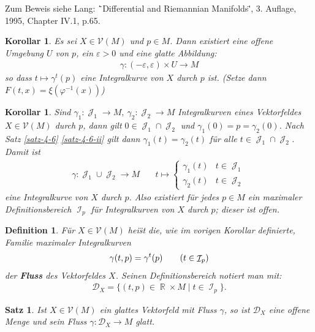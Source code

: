 \documentclass[paper=A4, twoside, chapterprefix=true, bibliography=totoc, headsepline]{scrbook}
\let\temp\phi{}
\let\phi\varphi{}
\let\varphi\temp{}
\let\temp\theta{}
\let\theta\vartheta{}
\let\vartheta\temp{}
\let\temp\epsilon{}
\let\epsilon\varepsilon{}
\let\varepsilon\temp{}
\let\temp\rho{}
\let\rho\varrho{}
\let\varrho\temp{}
\DeclareMathOperator{\R}{\mathbb{R}}
\DeclareMathOperator{\calI}{\mathcal{I}}
\DeclareMathOperator{\calJ}{\mathcal{J}}
\theoremstyle{plain}
\newtheorem{Satz}[Dfn]{Satz}
\newtheorem{Kor}[Dfn]{Korollar}
\theoremstyle{nonumberplain}
\newtheorem{dfn}{Definition}
\theoremstyle{empty}
\theoremstyle{break}
\newcommand{\CmIndex}[2][]{\ifthenelse{\isempty{#1}}{\index{#2}}{\index{#1}}#2}
\newcommand{\CmMark}[2][]{\textbf{\CmIndex[#1]{#2}}}
\begin{document}
Zum Beweis siehe Lang: \"`Differential and Riemannian Manifolds\"', 3. Auflage, 1995, Chapter IV.1, p.65\cite{lang1995differential}.

\begin{Kor}\label{korollar-4-7}\label{kor-4-7}
  Es sei $X \in \mathcal V(M)$ und $p \in M$. Dann existiert eine offene Umgebung $U$ von $p$, ein $\epsilon > 0$ und eine glatte Abbildung:
  \begin{align*}
    \gamma\colon(-\epsilon,\epsilon) \times U \to M
  \end{align*}
  so dass $t \mapsto \gamma^t(p)$ eine Integralkurve von $X$ durch $p$ ist. (Setze dann $F(t,x) = \xi(\phi^{-1}(x))$)
\end{Kor}

\begin{Kor}\label{korollar-4-8}
  Sind $\gamma_1 \colon \calJ_1 \to M, \ \gamma_2 \colon \calJ_2 \to M$ Integralkurven eines Vektorfeldes $X \in \mathcal V(M)$ durch $p$, dann gilt $0 \in \calJ_1 \cap \calJ_2$ und $\gamma_1(0)= p = \gamma_2(0)$.
  Nach Satz \ref{satz-4-6} \ref{satz-4-6-ii} gilt dann $\gamma_1(t) = \gamma_2(t)$ f\"ur alle $t \in \calJ_1 \cap \calJ_2$. Damit ist
  \begin{align*}
    \gamma \colon \calJ_1 \cup \calJ_2 \to M && \ t \mapsto 
    \begin{cases}
      \gamma_1(t) & t \in \calJ_1\\
      \gamma_2(t) & t \in \calJ_2
    \end{cases}
  \end{align*}
  eine Integralkurve von $X$ durch $p$.
  Also existiert f\"ur jedes $p \in M$ ein maximaler Definitionsbereich $\calI_p$ f\"ur Integralkurven von $X$ durch $p$; dieser ist offen.
\end{Kor}

\begin{dfn}
  F\"ur $X \in \mathcal V(M)$ hei\"st die, wie im vorigen Korollar definierte, Familie maximaler Integralkurven
  \begin{align*}
    \gamma(t,p) = \gamma^t(p) \tag{$t \in \calI_p$}
  \end{align*}
  der \CmMark{Fluss} des Vektorfeldes $X$.
  Seinen Definitionsbereich notiert man mit:
  \begin{align*}
    \mathcal D_X = \{(t,p) \in \R \times M \mid t \in \calI_p\}.
  \end{align*}
\end{dfn}

\begin{Satz}\label{satz-4-9}
  Ist $X \in \mathcal V(M)$ ein glattes Vektorfeld mit Fluss $\gamma$, so ist $\mathcal D_X$ eine offene Menge und sein Fluss $\gamma \colon \mathcal D_X \to M$ glatt.
\end{Satz}
\end{document}
